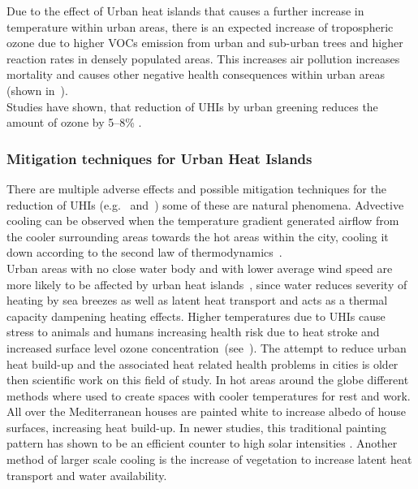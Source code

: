 \documentclass[12pt,a4paper, english,twoside]{scrartcl}
\begin{document}
      Due to the effect of Urban heat islands that causes a further increase in temperature within urban areas, there is an expected increase of tropospheric ozone due to higher \glspl{VOC} emission from urban and sub-urban trees and higher reaction rates in densely populated areas. 
      This increases air pollution increases mortality and causes other negative health consequences within urban areas (shown in~\cite{Ebi2008}).\\ 
      Studies have shown, that reduction of \glspl{UHI} by urban greening reduces the amount of ozone by 5--8\% \autocite[p.209]{Fallmann2016}. 
    \subsubsection{Mitigation techniques for Urban Heat Islands}\label{ssec:mitigation}
      There are multiple adverse effects and possible mitigation techniques for the reduction of \glspl{UHI} (e.g.~\cite{Nichol1994} and~\cite{Stewart2011}) some of these are natural phenomena. %
      Advective cooling can be observed when the temperature gradient generated airflow from the cooler surrounding areas towards the hot areas within the city, cooling it down according to the second law of thermodynamics~\autocite{HaegerEugensson1999}. \\
      Urban areas with no close water body  and with lower average wind speed are more likely to be affected by urban heat islands~\autocite{Ramamurthy2017}, since water reduces severity of heating by sea breezes as well as latent heat transport and acts as a thermal capacity dampening heating effects. 
      Higher temperatures due to \glspl{UHI} cause stress to animals and humans increasing health risk due to heat stroke and increased surface level ozone concentration~(see~\cite{Santamouris2020}).%
      The attempt to reduce urban heat build-up and the associated heat related health problems in cities is older then scientific work on this field of study. 
      In hot areas around the globe different methods where used to create spaces with cooler temperatures for rest and work. 
      All over the Mediterranean houses are painted white to increase albedo of house surfaces, increasing heat build-up. 
      In newer studies, this traditional painting pattern has shown to be an efficient counter to high solar intensities \autocite{Fayad2021}.
      Another method of larger scale cooling is the increase of vegetation to increase latent heat transport and water availability.
\end{document}

